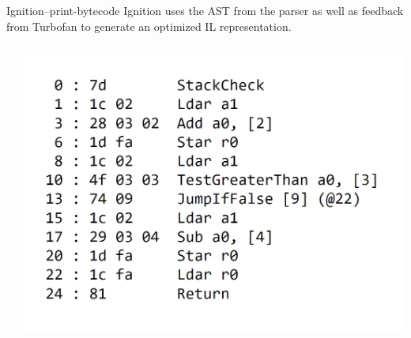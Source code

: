 \begin{frame}{Ignition}{--print-bytecode}
    Ignition uses the AST from the parser as well as feedback from Turbofan to generate an optimized IL representation.
    \begin{columns}
        \begin{column}{0.5\textwidth}
            \inputminted{js}{code/print-bytecode.tex}
        \end{column}
        \begin{column}{0.5\textwidth}
            \includegraphics[width=\textwidth]{images/v8-ignition-bytecode.png}
        \end{column}
    \end{columns}
\end{frame}

